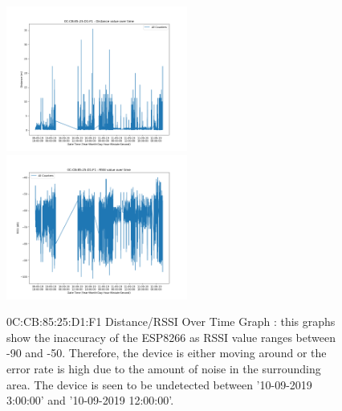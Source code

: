\documentclass{report}
\begin{document}
\begin{figure}[h!]
    \centering
    \includegraphics[width=225]{distance_over_time_for_0C_CB_85_25_D1_F1.png}
    \includegraphics[width=225]{rssi_over_time_for_0C_CB_85_25_D1_F1.png}
    \caption{0C:CB:85:25:D1:F1 Distance/RSSI Over Time Graph :  this graphs show the inaccuracy of the ESP8266 as RSSI value ranges between -90 and -50. Therefore, the device is either moving around or the error rate is high due to the amount of noise in the surrounding area. The device is seen to be undetected between '10-09-2019 3:00:00' and '10-09-2019 12:00:00'.}
    \label{fig:rssiDistanceOverTime}
\end{figure} \\
\end{document}
